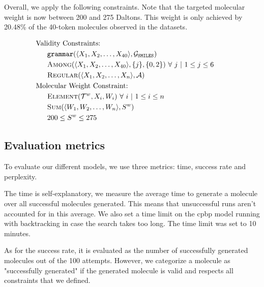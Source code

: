 \documentclass[../Document.tex]{subfiles}
\begin{document}
Overall, we apply the following constraints. Note that the targeted molecular weight is now between 200 and 275 Daltons.
This weight is only achieved by 20.48\% of the 40-token molecules observed in the datasets.

\begin{align*}
    &\text{Validity Constraints:}\\
    &\hspace{16pt} \texttt{grammar}(\langle X_1, X_2, \ldots, X_{40} \rangle, \mathcal{G}_{\texttt{SMILES}})\\
    &\hspace{16pt} \among(\langle X_1, X_2, \ldots, X_{40} \rangle, \{j\}, \{0,2\})\ \forall\ j\ \vert\ 1 \leq j \leq 6\\
    &\hspace{16pt} \regular(\langle X_1, X_2, \ldots, X_n \rangle, \mathcal{A})\\
    &\text{Molecular Weight Constraint:} & &\\
    &\hspace{16pt} \element({\cal T}^w, X_i, W_i)\ \forall\ i\ \vert\ 1 \leq i \leq n\\
    &\hspace{16pt} \somme(\langle W_1, W_2,\ldots,W_n \rangle, S^w)\\
    &\hspace{16pt} 200 \leq S^w \leq 275
\end{align*}


\subsection{Evaluation metrics}
To evaluate our different models, we use three metrics: time, success rate and perplexity.

The time is self-explanatory, we measure the average time to generate a molecule over all successful molecules generated. This means that unsuccessful runs aren't accounted for in this average. We also set a time limit on the \gls{cpbp} model running with backtracking in case the search takes too long. The time limit was set to 10 minutes.

As for the success rate, it is evaluated as the number of successfully generated molecules out of the 100 attempts. However, we categorize a molecule as "successfully generated" if the generated molecule is valid and respects all constraints that we defined.
\end{document}
